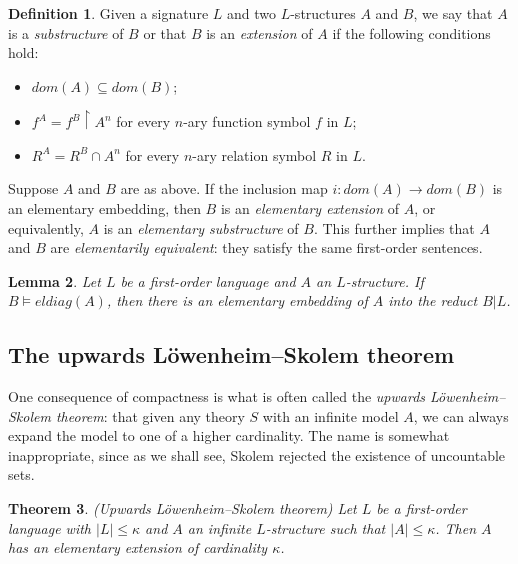 \documentclass[10pt, a4paper, oneside]{article}
\newtheorem{thm}{Theorem}[section]
\theoremstyle{definition}
\newtheorem{dfn}[thm]{Definition}
\theoremstyle{remark}
\theoremstyle{plain}
\newtheorem{lem}[thm]{Lemma}
\theoremstyle{plain}
\begin{document}
\begin{dfn}
    Given a signature $L$ and two $L$-structures $A$ and $B$, we say that
    $A$ is a \emph{substructure} of $B$ or that $B$ is an \emph{extension} of
    $A$ if the following conditions hold:
    
    \begin{itemize}
        \item $dom(A) \subseteq dom(B)$;
        \item $f^A = f^B \restriction A^n$ for every $n$-ary function symbol $f$
            in $L$;
        \item $R^A = R^B \cap A^n$ for every $n$-ary relation symbol $R$
            in $L$.
    \end{itemize}
    
    Suppose $A$ and $B$ are as above. If the inclusion map $i : dom(A)
    \rightarrow dom(B)$ is an elementary embedding, then $B$ is an
    \emph{elementary extension} of $A$, or equivalently, $A$ is an
    \emph{elementary substructure} of $B$. This further implies that $A$ and $B$
    are \emph{elementarily equivalent}: they satisfy the same first-order
    sentences.
\end{dfn}

\begin{lem}
    \label{eldiag_lem}
    Let $L$ be a first-order language and $A$ an $L$-structure. If $B \models
    eldiag(A)$, then there is an elementary embedding of $A$ into the reduct
    $B | L$.
\end{lem}

\subsection{The upwards Löwenheim--Skolem theorem}

One consequence of compactness is what is often called the \emph{upwards
Löwenheim--Skolem theorem}: that given any theory $S$ with an infinite model
$A$, we can always expand the model to one of a higher cardinality. The name is
somewhat inappropriate, since as we shall see, Skolem rejected the existence of
uncountable sets.

\begin{thm}
    \label{up_lst}
    (Upwards Löwenheim--Skolem theorem) Let $L$ be a first-order language with
    $|L| \leq \kappa$ and $A$ an infinite $L$-structure such that $|A| \leq
    \kappa$. Then $A$ has an elementary extension of cardinality $\kappa$.
\end{thm}
\end{document}
